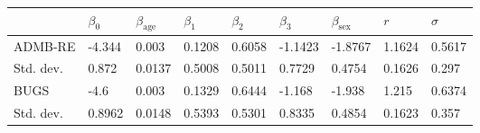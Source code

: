 \documentclass[10pt]{article}
\begin{document}
\begin{center}
\begin{tabular}{lllllllll}
& $\beta _{0}$ & $\beta _{\text{age}}$ & $\beta _{1}$ & $\beta _{2}$ & $ \beta _{3}$ & $\beta _{\text{sex}}$ & $r$ & $\sigma $ \\ \hline
ADMB-RE & -4.344 & 0.003 & 0.1208 & 0.6058 & -1.1423 & -1.8767 & 1.1624
& 0.5617 \\ 
Std. dev. & 0.872 & 0.0137 & 0.5008 & 0.5011 & 0.7729 & 0.4754 & 0.1626 & 
0.297 \\ 
BUGS & -4.6 & 0.003 & 0.1329 & 0.6444 & -1.168 & -1.938 & 1.215 & 0.6374 \\ 
Std. dev. & 0.8962 & 0.0148 & 0.5393 & 0.5301 & 0.8335 & 0.4854 & 0.1623 & 0.357%
\end{tabular}%
\end{center}
\end{document}
